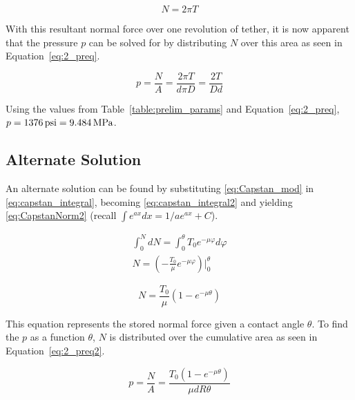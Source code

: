 \begin{equation}
	\label{eq:CapstanNorm}
	N=2\pi T	
\end{equation}

With this resultant normal force over one revolution of tether, it is now apparent that the pressure $p$ can be solved for by distributing $N$ over this area as seen in Equation~\ref{eq:2_preq}.

\begin{equation}
	\label{eq:2_preq}
	p=\frac{N}{A}=\frac{2\pi T}{d\pi D}=\frac{2T}{Dd}
\end{equation}

Using the values from Table~\ref{table:prelim_params} and Equation~\ref{eq:2_preq}, $p=1376\,\mathrm{psi}= 9.484\,\mathrm{MPa}$. 

\subsection{Alternate Solution}
\label{subsection:alt}

An alternate solution can be found by substituting \ref{eq:Capstan_mod} in \ref{eq:capstan_integral}, becoming \ref{eq:capstan_integral2} and yielding \ref{eq:CapstanNorm2} (recall $\int e^{ax} dx = 1/a e^{ax} + C$).

\begin{equation}
	\label{eq:capstan_integral2}
	\begin{aligned}
		\int_0^N dN =\int_0^{\theta} T_{0} e^{-\mu \varphi} d\varphi            \\
		N = \left( -\frac{T_{0}}{\mu} e^{-\mu \varphi} \right) \Big|_0^{\theta} 
	\end{aligned}
\end{equation}

\begin{equation}
	\label{eq:CapstanNorm2}
	N = \frac{T_{0}}{\mu} \left( 1 - e^{-\mu \theta} \right)
\end{equation}

This equation represents the stored normal force given a contact angle $\theta$. To find the $p$ as a function $\theta$, $N$ is distributed over the cumulative area as seen in Equation~\ref{eq:2_preq2}.

\begin{equation}
	\label{eq:2_preq2}
	p=\frac{N}{A}= \frac{T_{0} \left( 1 - e^{-\mu \theta} \right)}{\mu d R \theta}
\end{equation}


